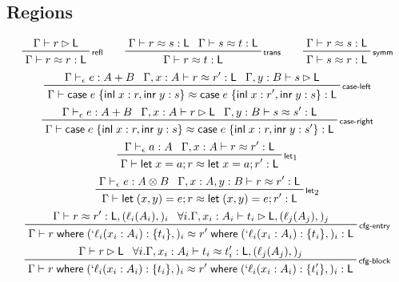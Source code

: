 \documentclass[acmsmall,screen,review]{acmart}
\newcommand{\ms}[1]{\ensuremath{\mathsf{#1}}}
\newcommand{\lbl}[1]{{`#1}}
\newcommand{\lto}{:}
\newcommand{\linl}[1]{\ms{inl}\;{#1}}
\newcommand{\linr}[1]{\ms{inr}\;{#1}}
\newcommand{\caseexpr}[5]{\ms{case}\;#1\;\{\linl{#2} \lto #3, \linr{#4} \lto #5\}}
\newcommand{\letstmt}[3]{\ensuremath{\ms{let}\;#1 = #2; #3}}
\newcommand{\where}[2]{#1\;\ms{where}\;#2}
\newcommand{\wbranch}[3]{#1(#2) \lto \{#3\}}
\newcommand{\lwbranch}[3]{\wbranch{\lbl{#1}}{#2}{#3}}
\newcommand{\bhyp}[2]{#1 : #2}
\newcommand{\lhyp}[2]{#1(#2)}
\newcommand{\rle}[1]{{\scriptsize\textsf{#1}}}
\newcommand{\hasty}[4]{#1 \vdash_{#2} #3: {#4}}
\newcommand{\haslb}[3]{#1 \vdash #2 \rhd #3}
\newcommand{\teqv}{\approx}
\newcommand{\lbeq}[4]{#1 \vdash #2 \teqv #3 : {#4}}
\begin{document}
\subsection{Regions}

\begin{gather*}
  \prftree[r]{\rle{refl}}{\haslb{\Gamma}{r}{\ms{L}}}{\lbeq{\Gamma}{r}{r}{\ms{L}}} \qquad
  \prftree[r]{\rle{trans}}{\lbeq{\Gamma}{r}{s}{\ms{L}}}{\lbeq{\Gamma}{s}{t}{\ms{L}}}
    {\lbeq{\Gamma}{r}{t}{\ms{L}}} \qquad
  \prftree[r]{\rle{symm}}{\lbeq{\Gamma}{r}{s}{\ms{L}}}{\lbeq{\Gamma}{s}{r}{\ms{L}}}
  \\
  \prftree[r]{\rle{case-left}}
    {\hasty{\Gamma}{\epsilon}{e}{A + B}}
    {\lbeq{\Gamma, \bhyp{x}{A}}{r}{r'}{\ms{L}}}
    {\haslb{\Gamma, \bhyp{y}{B}}{s}{\ms{L}}}
    {\lbeq{\Gamma}{\caseexpr{e}{x}{r}{y}{s}}{\caseexpr{e}{x}{r'}{y}{s}}{\ms{L}}}
  \\
  \prftree[r]{\rle{case-right}}
    {\hasty{\Gamma}{\epsilon}{e}{A + B}}
    {\haslb{\Gamma, \bhyp{x}{A}}{r}{\ms{L}}}
    {\lbeq{\Gamma, \bhyp{y}{B}}{s}{s'}{\ms{L}}}
    {\lbeq{\Gamma}{\caseexpr{e}{x}{r}{y}{s}}{\caseexpr{e}{x}{r}{y}{s'}}{\ms{L}}}
  \\
  \prftree[r]{\rle{let}$_1$}
    {\hasty{\Gamma}{\epsilon}{a}{A}}
    {\lbeq{\Gamma, \bhyp{x}{A}}{r}{r'}{\ms{L}}}
    {\lbeq{\Gamma}{\letstmt{x}{a}{r}}{\letstmt{x}{a}{r'}}{\ms{L}}}
  \\
  \prftree[r]{\rle{let}$_2$}
    {\hasty{\Gamma}{\epsilon}{e}{A \otimes B}}
    {\lbeq{\Gamma, \bhyp{x}{A}, \bhyp{y}{B}}{r}{r'}{\ms{L}}}
    {\lbeq{\Gamma}{\letstmt{(x, y)}{e}{r}}{\letstmt{(x, y)}{e}{r'}}{\ms{L}}}
  \\
  \prftree[r]{\rle{cfg-entry}}
    {\lbeq{\Gamma}{r}{r'}{\ms{L}, (\lhyp{\ell_i}{A_i},)_i}}
    {\forall i. \haslb{\Gamma, \bhyp{x_i}{A_i}}{t_i}{\ms{L}, (\lhyp{\ell_j}{A_j},)_j}}
    {\lbeq{\Gamma}
      {\where{r}{(\lwbranch{\ell_i}{x_i: A_i}{t_i},)_i}}
      {\where{r'}{(\lwbranch{\ell_i}{x_i: A_i}{t_i},)_i}}
      {\ms{L}}
    }
  \\
  \prftree[r]{\rle{cfg-block}}
    {\haslb{\Gamma}{r}{\ms{L}}}
    {\forall i. \lbeq{\Gamma, \bhyp{x_i}{A_i}}{t_i}{t_i'}{\ms{L}, (\lhyp{\ell_j}{A_j},)_j}}
    {\lbeq{\Gamma}
      {\where{r}{(\lwbranch{\ell_i}{x_i: A_i}{t_i},)_i}}
      {\where{r'}{(\lwbranch{\ell_i}{x_i: A_i}{t_i'},)_i}}
      {\ms{L}}
    }
\end{gather*}
\end{document}
